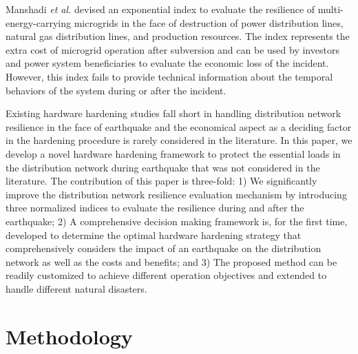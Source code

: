 \documentclass[conference]{IEEEtran}
\begin{document}
Manshadi \emph{et al.} \cite{Manshadi_2015} devised an exponential index to evaluate the resilience of multi-energy-carrying microgrids in the face of destruction of power distribution lines, natural gas distribution lines, and production resources. The index represents the extra cost of microgrid operation after subversion and can be used by investors and power system beneficiaries to evaluate the economic loss of the incident. However, this index fails to provide technical information about the temporal behaviors of the system during or after the incident. %

Existing hardware hardening studies fall short in handling distribution network resilience in the face of earthquake and the economical aspect as a deciding factor in the hardening procedure is rarely considered in the literature. In this paper, we develop a novel hardware hardening framework to protect the essential loads in the distribution network during earthquake that was not considered in the literature. The contribution of this paper is three-fold: 1) We significantly improve the distribution network resilience evaluation mechanism by introducing three normalized indices to evaluate the resilience during and after the earthquake; 2) A comprehensive decision making framework is, for the first time, developed to determine the optimal hardware hardening strategy that comprehensively considers the impact of an earthquake on the distribution network as well as the costs and benefits; and 3) The proposed method can be readily customized to achieve different operation objectives and extended to handle different natural disasters.

\section{Methodology}
\end{document}
